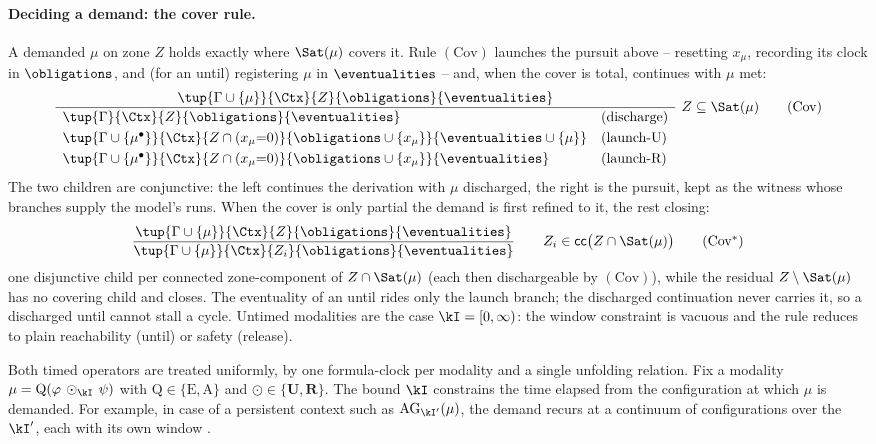 






\paragraph{Deciding a demand: the cover rule.}
A demanded $\mu$ on zone $Z$ holds exactly where $\Sat(\mu)$ covers it. Rule $(\mathrm{Cov})$ {launches} the pursuit above -- resetting $x_\mu$, recording its clock in $\obligations$, and (for an until) registering $\mu$ in $\eventualities$ -- and, when the cover is total, continues with $\mu$ met:
\[
\frac{\tup{\Gamma\cup\{\mu\}}{\Ctx}{Z}{\obligations}{\eventualities}}
{\begin{array}{ll}
\tup{\Gamma}{\Ctx}{Z}{\obligations}{\eventualities} & (\text{discharge})\\[3pt]
\tup{\Gamma\cup\{\mu^\bullet\}}{\Ctx}{Z\cap(x_\mu{=}0)}{\obligations\cup\{x_\mu\}}{\eventualities\cup\{\mu\}} & (\text{launch-U})\\[3pt]
\tup{\Gamma\cup\{\mu^\bullet\}}{\Ctx}{Z\cap(x_\mu{=}0)}{\obligations\cup\{x_\mu\}}{\eventualities} & (\text{launch-R})
\end{array}}
\ Z\subseteq\Sat(\mu)
\tag{\textrm{Cov}}\label{tag:chk}
\]
The two children are conjunctive: the left continues the derivation with $\mu$ discharged, the right {is} the pursuit, kept as the witness whose branches supply the model's runs. When the cover is only partial the demand is first refined to it, the rest closing:
\[
\frac{\tup{\Gamma\cup\{\mu\}}{\Ctx}{Z}{\obligations}{\eventualities}}
{\tup{\Gamma\cup\{\mu\}}{\Ctx}{Z_i}{\obligations}{\eventualities}}
\qquad Z_i\in\mathsf{cc}\big(Z\cap\Sat(\mu)\big)
\tag{\textrm{Cov}$^{*}$}\label{tag:chkstar}
\]
one disjunctive child per connected zone-component of $Z\cap\Sat(\mu)$ (each then dischargeable by $(\mathrm{Cov})$), while the residual $Z\setminus\Sat(\mu)$ has no covering child and closes. The eventuality of an until rides only the launch branch; the discharged continuation never carries it, so a discharged until cannot stall a cycle. Untimed modalities are the case $\kI=[0,\infty)$: the window constraint is vacuous and the rule reduces to plain reachability (until) or safety (release).






Both timed operators are treated uniformly, by one formula-clock per modality and a single unfolding relation. Fix a modality $\mu=\mathrm{Q}(\varphi\,\odot_\kI\,\psi)$ with $\mathrm{Q}\in\{\mathrm{E},\mathrm{A}\}$ and $\odot\in\{\mathbf{U},\mathbf{R}\}$. The bound $\kI$ constrains the time elapsed from the configuration at which $\mu$ is demanded. For example, in case of a persistent context such as $\mathrm{AG}_{\kI '}(\mu)$, the demand recurs at a continuum of configurations over the $\kI'$, each with its own window \kI. 

